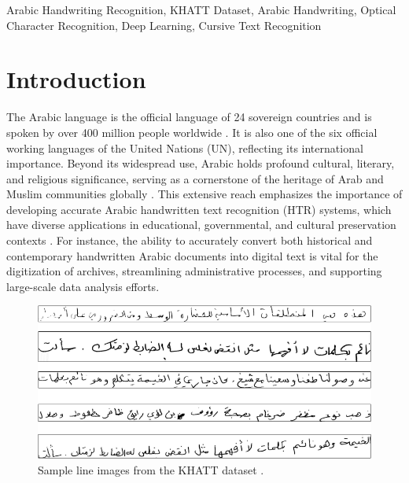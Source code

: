 \documentclass[conference]{IEEEtran}
\begin{document}

\begin{IEEEkeywords}
Arabic Handwriting Recognition, KHATT Dataset, Arabic Handwriting, Optical Character Recognition, Deep Learning, Cursive Text Recognition
\end{IEEEkeywords}

\section{Introduction}

The Arabic language is the official language of 24 sovereign countries and is spoken by over 400 million people worldwide \cite{saeed2024muharaf}. It is also one of the six official working languages of the United Nations (UN), reflecting its international importance. Beyond its widespread use, Arabic holds profound cultural, literary, and religious significance, serving as a cornerstone of the heritage of Arab and Muslim communities globally \cite{ayuba2013}. This extensive reach emphasizes the importance of developing accurate Arabic handwritten text recognition (HTR) systems, which have diverse applications in educational, governmental, and cultural preservation contexts \cite{mutawa2024machine}. For instance, the ability to accurately convert both historical and contemporary handwritten Arabic documents into digital text is vital for the digitization of archives, streamlining administrative processes, and supporting large-scale data analysis efforts.

\begin{figure}[t]
  \centering
  \includegraphics[width=0.9\linewidth]{Figs/fig1.png}
  \caption{Sample line images from the KHATT dataset \cite{mahmoud2014khatt}.}
  \label{fig:engagement_examples}
\end{figure}
\end{document}
